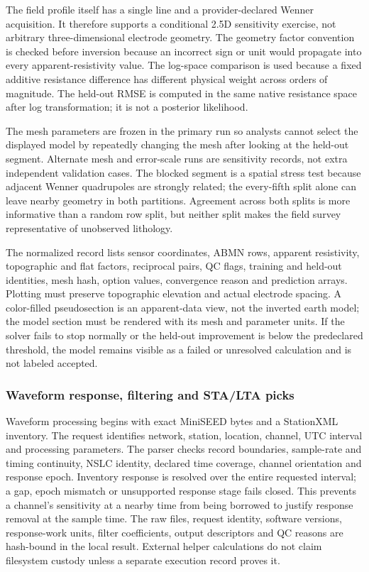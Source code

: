 The field profile itself has a single line and a provider-declared
Wenner acquisition. It therefore supports a conditional 2.5D sensitivity
exercise, not arbitrary three-dimensional electrode geometry. The
geometry factor convention is checked before inversion because an
incorrect sign or unit would propagate into every apparent-resistivity
value. The log-space comparison is used because a fixed additive
resistance difference has different physical weight across orders of
magnitude. The held-out RMSE is computed in the same native resistance
space after log transformation; it is not a posterior likelihood.

The mesh parameters are frozen in the primary run so analysts cannot
select the displayed model by repeatedly changing the mesh after looking
at the held-out segment. Alternate mesh and error-scale runs are
sensitivity records, not extra independent validation cases. The
blocked segment is a spatial stress test because adjacent Wenner
quadrupoles are strongly related; the every-fifth split alone can leave
nearby geometry in both partitions. Agreement across both splits is
more informative than a random row split, but neither split makes the
field survey representative of unobserved lithology.

The normalized record lists sensor coordinates, ABMN rows, apparent
resistivity, topographic and flat factors, reciprocal pairs, QC flags,
training and held-out identities, mesh hash, option values, convergence
reason and prediction arrays. Plotting must preserve topographic
elevation and actual electrode spacing. A color-filled pseudosection is
an apparent-data view, not the inverted earth model; the model section
must be rendered with its mesh and parameter units. If the solver fails
to stop normally or the held-out improvement is below the predeclared
threshold, the model remains visible as a failed or unresolved
calculation and is not labeled accepted.

\subsubsection{Waveform response, filtering and STA/LTA picks}\label{method-waveform}

Waveform processing begins with exact MiniSEED bytes and a StationXML inventory. The
request identifies network, station, location, channel, UTC interval and
processing parameters. The parser checks record boundaries, sample-rate
and timing continuity, NSLC identity, declared time coverage, channel
orientation and response epoch. Inventory response is resolved over the
entire requested interval; a gap, epoch mismatch or unsupported response
stage fails closed. This prevents a channel's sensitivity at a nearby
time from being borrowed to justify response removal at the sample time.
The raw files, request identity, software versions, response-work units,
filter coefficients, output descriptors and QC reasons are hash-bound in
the local result. External helper calculations do not claim filesystem
custody unless a separate execution record proves it.

